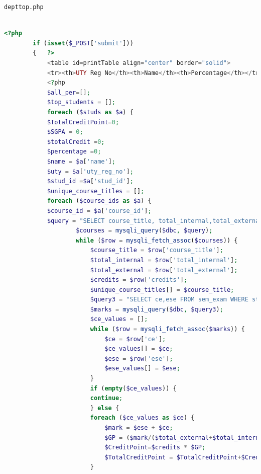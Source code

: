 \documentclass{nascproject}
\begin{document}
\begin{appendices}
\begin{lstlisting}[language=php]
\end{lstlisting}

\texttt{dept\textunderscore top.php}

\begin{lstlisting}[language=php]

<?php
        if (isset($_POST['submit']))
        {   ?>
            <table id=printTable align="center" border="solid">
            <tr><th>UTY Reg No</th><th>Name</th><th>Percentage</th></tr>
            <?php
            $all_per=[];
            $top_students = [];
            foreach ($studs as $a) {
            $TotalCreditPoint=0;
            $SGPA = 0;
            $totalCredit =0;
            $percentage =0;
            $name = $a['name'];
            $uty = $a['uty_reg_no'];
            $stud_id =$a['stud_id'];
            $unique_course_titles = [];
            foreach ($course_ids as $a) {
            $course_id = $a['course_id'];
            $query = "SELECT course_title, total_internal,total_external, credits FROM course WHERE course_id = " . $course_id . " AND semester = " .$semester." credits <> " . $credit . " AND  syllabus_intro_year IN (" . $year . ", " . $year2 . ")";
                    $courses = mysqli_query($dbc, $query);
                    while ($row = mysqli_fetch_assoc($courses)) {
                        $course_title = $row['course_title'];
                        $total_internal = $row['total_internal'];
                        $total_external = $row['total_external'];
                        $credits = $row['credits'];
                        $unique_course_titles[] = $course_title;     
                        $query3 = "SELECT ce,ese FROM sem_exam WHERE stud_id = " . $stud_id . " AND course_id = " . $course_id;
                        $marks = mysqli_query($dbc, $query3);
                        $ce_values = [];
                        while ($row = mysqli_fetch_assoc($marks)) {
                            $ce = $row['ce'];
                            $ce_values[] = $ce;
                            $ese = $row['ese'];
                            $ese_values[] = $ese;
                        }
                        if (empty($ce_values)) {
                        continue;
                        } else {
                        foreach ($ce_values as $ce) {
                            $mark = $ese + $ce;
                            $GP = ($mark/($total_external+$total_internal)) * 10 ;
                            $CreditPoint=$credits * $GP;
                            $TotalCreditPoint = $TotalCreditPoint+$CreditPoint;          }
                        }

\end{lstlisting}
\end{appendices}
\end{document}
